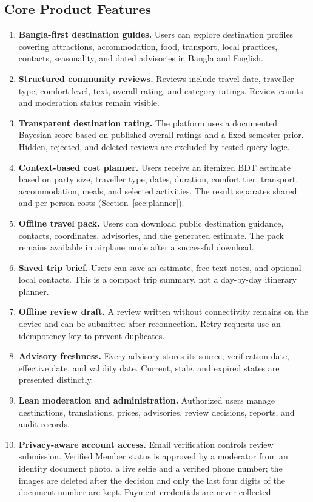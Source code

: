 \documentclass[11pt,a4paper]{article}
\begin{document}
\subsection{Core Product Features}
\begin{enumerate}
  \item \textbf{Bangla-first destination guides.} Users can explore destination profiles covering attractions, accommodation, food, transport, local practices, contacts, seasonality, and dated advisories in Bangla and English.
  \item \textbf{Structured community reviews.} Reviews include travel date, traveller type, comfort level, text, overall rating, and category ratings. Review counts and moderation status remain visible.
  \item \textbf{Transparent destination rating.} The platform uses a documented Bayesian score based on published overall ratings and a fixed semester prior. Hidden, rejected, and deleted reviews are excluded by tested query logic.
  \item \textbf{Context-based cost planner.} Users receive an itemized BDT estimate based on party size, traveller type, dates, duration, comfort tier, transport, accommodation, meals, and selected activities. The result separates shared and per-person costs (Section~\ref{sec:planner}).
  \item \textbf{Offline travel pack.} Users can download public destination guidance, contacts, coordinates, advisories, and the generated estimate. The pack remains available in airplane mode after a successful download.
  \item \textbf{Saved trip brief.} Users can save an estimate, free-text notes, and optional local contacts. This is a compact trip summary, not a day-by-day itinerary planner.
  \item \textbf{Offline review draft.} A review written without connectivity remains on the device and can be submitted after reconnection. Retry requests use an idempotency key to prevent duplicates.
  \item \textbf{Advisory freshness.} Every advisory stores its source, verification date, effective date, and validity date. Current, stale, and expired states are presented distinctly.
  \item \textbf{Lean moderation and administration.} Authorized users manage destinations, translations, prices, advisories, review decisions, reports, and audit records.
  \item \textbf{Privacy-aware account access.} Email verification controls review submission. Verified Member status is approved by a moderator from an identity document photo, a live selfie and a verified phone number; the images are deleted after the decision and only the last four digits of the document number are kept. Payment credentials are never collected.

\end{enumerate}
\end{document}
